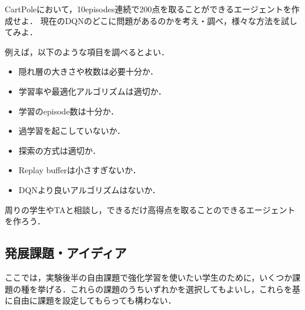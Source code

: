   \begin{practice}
   CartPoleにおいて，10episodes連続で200点を取ることができるエージェントを作成せよ．
   現在のDQNのどこに問題があるのかを考え・調べ，様々な方法を試してみよ．
  \end{practice}

  例えば，以下のような項目を調べるとよい．
  \begin{itemize}
   \item 隠れ層の大きさや枚数は必要十分か．
   \item 学習率や最適化アルゴリズムは適切か．
   \item 学習のepisode数は十分か．
   \item 過学習を起こしていないか．
   \item 探索の方式は適切か．
   \item Replay bufferは小さすぎないか．
   \item DQNより良いアルゴリズムはないか．
  \end{itemize}

  周りの学生やTAと相談し，できるだけ高得点を取ることのできるエージェントを作ろう．

  \subsection{発展課題・アイディア}

  ここでは，実験後半の自由課題で強化学習を使いたい学生のために，いくつか課題の種を挙げる．これらの課題のうちいずれかを選択してもよいし，これらを基に自由に課題を設定してもらっても構わない．

